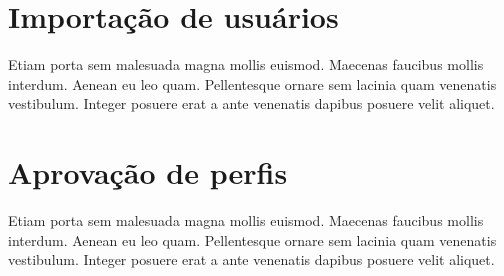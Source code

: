 \documentclass[letterpaper,10pt,english]{sphinxmanual}
\begin{document}
\section{Importação de usuários}
\label{admin/user-import:importacao-de-usuarios}\label{admin/user-import::doc}
Etiam porta sem malesuada magna mollis euismod. Maecenas faucibus mollis interdum. Aenean eu leo quam. Pellentesque ornare sem lacinia quam venenatis vestibulum. Integer posuere erat a ante venenatis dapibus posuere velit aliquet.


\section{Aprovação de perfis}
\label{admin/profile-approval::doc}\label{admin/profile-approval:aprovacao-de-perfis}
Etiam porta sem malesuada magna mollis euismod. Maecenas faucibus mollis interdum. Aenean eu leo quam. Pellentesque ornare sem lacinia quam venenatis vestibulum. Integer posuere erat a ante venenatis dapibus posuere velit aliquet.



\renewcommand{\indexname}{Index}
\printindex
\end{document}
